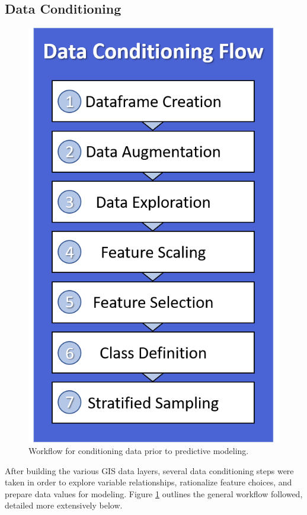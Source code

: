 \subsection{Data Conditioning}\label{ch3:conditioning}
\begin{figure}
\centering
\includegraphics[width=0.89\linewidth]{templates/images/Flow-DataConditioning.png}
\singlespacing
\caption[Data conditioning workflow]{Workflow for conditioning data prior to predictive modeling.}
\label{fig:DC_Flow}
\end{figure}
After building the various GIS data layers, several data conditioning steps were taken in order to explore variable relationships, rationalize feature choices, and prepare data values for modeling. Figure \ref{fig:DC_Flow} outlines the general workflow followed, detailed more extensively below.

